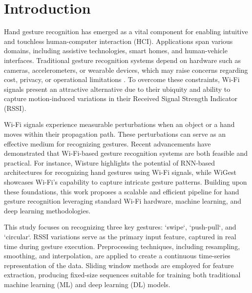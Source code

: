 \documentclass[10pt,twocolumn,letterpaper]{article}
\begin{document}

\section{Introduction}

Hand gesture recognition has emerged as a vital component for enabling intuitive and touchless human-computer interaction (HCI). Applications span various domains, including assistive technologies, smart homes, and human-vehicle interfaces. Traditional gesture recognition systems depend on hardware such as cameras, accelerometers, or wearable devices, which may raise concerns regarding cost, privacy, or operational limitations \cite{camera_based, sensor_based}. To overcome these constraints, Wi-Fi signals present an attractive alternative due to their ubiquity and ability to capture motion-induced variations in their Received Signal Strength Indicator (RSSI).

Wi-Fi signals experience measurable perturbations when an object or a hand moves within their propagation path. These perturbations can serve as an effective medium for recognizing gestures. Recent advancements have demonstrated that Wi-Fi-based gesture recognition systems are both feasible and practical. For instance, Wisture \cite{haseeb2020wisture} highlights the potential of RNN-based architectures for recognizing hand gestures using Wi-Fi signals, while WiGest \cite{abdelnasser2015wifi} showcases Wi-Fi's capability to capture intricate gesture patterns. Building upon these foundations, this work proposes a scalable and efficient pipeline for hand gesture recognition leveraging standard Wi-Fi hardware, machine learning, and deep learning methodologies.

This study focuses on recognizing three key gestures: `swipe`, `push-pull`, and `circular`. RSSI variations serve as the primary input feature, captured in real time during gesture execution. Preprocessing techniques, including resampling, smoothing, and interpolation, are applied to create a continuous time-series representation of the data. Sliding window methods are employed for feature extraction, producing fixed-size sequences suitable for training both traditional machine learning (ML) and deep learning (DL) models.
\end{document}
